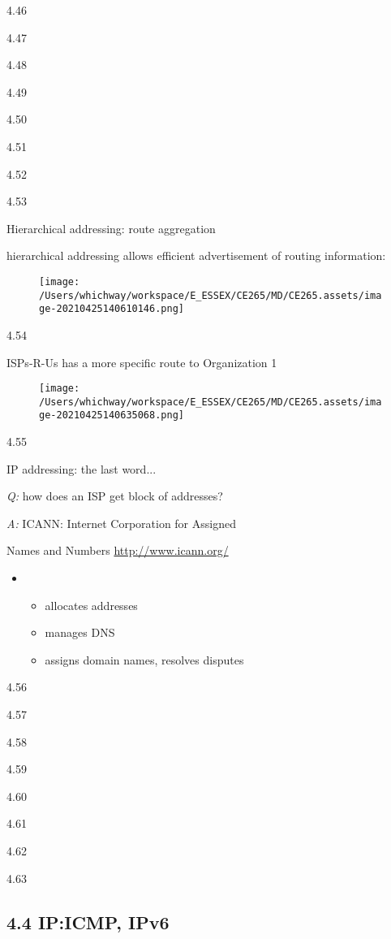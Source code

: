 \documentclass[
]{article}
\begin{document}
4.46

4.47

4.48

4.49

4.50

4.51

4.52

4.53

Hierarchical addressing: route aggregation

hierarchical addressing allows efficient advertisement of routing
information:

\begin{figure}
\centering
\texttt{[image: /Users/whichway/workspace/E\_ESSEX/CE265/MD/CE265.assets/image-20210425140610146.png]}
\caption{}
\end{figure}

4.54

ISPs-R-Us has a more specific route to Organization 1

\begin{figure}
\centering
\texttt{[image: /Users/whichway/workspace/E\_ESSEX/CE265/MD/CE265.assets/image-20210425140635068.png]}
\caption{}
\end{figure}

4.55

IP addressing: the last word...

\emph{Q:} how does an ISP get block of addresses?

\emph{A:} ICANN: Internet Corporation for Assigned

Names and Numbers \url{http://www.icann.org/}

\begin{itemize}
\item
  \begin{itemize}
  \item
    allocates addresses
  \item
    manages DNS
  \item
    assigns domain names, resolves disputes
  \end{itemize}
\end{itemize}

4.56

4.57

4.58

4.59

4.60

4.61

4.62

4.63

\hypertarget{44-ipicmp-ipv6}{%
\subsection{4.4 IP:ICMP, IPv6}\label{44-ipicmp-ipv6}}
\end{document}
